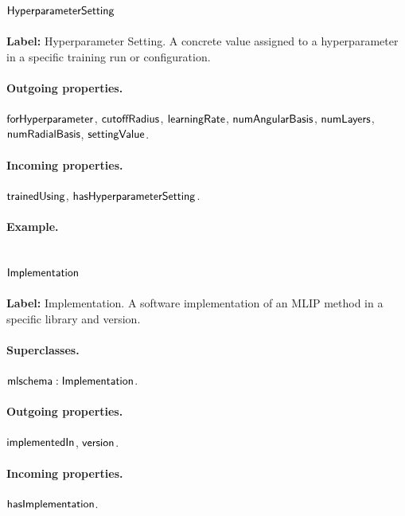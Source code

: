 \subsection{$\mathsf{HyperparameterSetting}$}
\label{sec:term-HyperparameterSetting}

\textbf{Label:} Hyperparameter Setting.
A concrete value assigned to a hyperparameter in a specific training run or configuration.

\paragraph{Outgoing properties.} $\mathsf{forHyperparameter}$, $\mathsf{cutoffRadius}$, $\mathsf{learningRate}$, $\mathsf{numAngularBasis}$, $\mathsf{numLayers}$, $\mathsf{numRadialBasis}$, $\mathsf{settingValue}$.

\paragraph{Incoming properties.} $\mathsf{trainedUsing}$, $\mathsf{hasHyperparameterSetting}$.

\paragraph{Example.}

\subsection{$\mathsf{Implementation}$}
\label{sec:term-Implementation}

\textbf{Label:} Implementation.
A software implementation of an MLIP method in a specific library and version.

\paragraph{Superclasses.} $\mathsf{mlschema:Implementation}$.

\paragraph{Outgoing properties.} $\mathsf{implementedIn}$, $\mathsf{version}$.

\paragraph{Incoming properties.} $\mathsf{hasImplementation}$.

